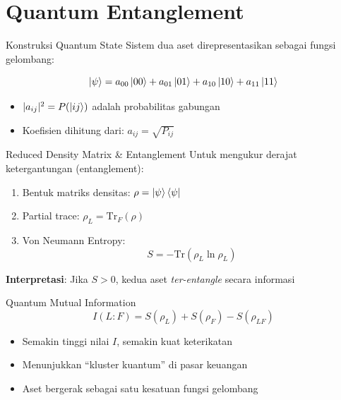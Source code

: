 \documentclass[aspectratio=169]{beamer}
\begin{document}
\section{Quantum Entanglement}

\begin{frame}{Konstruksi Quantum State}
    Sistem dua aset direpresentasikan sebagai fungsi gelombang:
    
    \begin{equation}
        \ket{\psi} = a_{00} \ket{00} + a_{01} \ket{01} + a_{10} \ket{10} + a_{11} \ket{11}
    \end{equation}
    
    \vspace{0.5cm}
    
    \begin{itemize}
        \item $|a_{ij}|^2 = P(\ket{ij})$ adalah probabilitas gabungan
        \item Koefisien dihitung dari: $a_{ij} = \sqrt{P_{ij}}$
    \end{itemize}
\end{frame}

\begin{frame}{Reduced Density Matrix \& Entanglement}
    Untuk mengukur derajat ketergantungan (entanglement):
    
    \begin{enumerate}
        \item Bentuk matriks densitas: $\rho = \ket{\psi}\bra{\psi}$
        \item Partial trace: $\rho_L = \text{Tr}_F(\rho)$
        \item Von Neumann Entropy:
        \begin{equation}
            S = -\text{Tr}(\rho_L \ln \rho_L)
        \end{equation}
    \end{enumerate}
    
    \vspace{0.5cm}
    
    \textbf{Interpretasi}: Jika $S > 0$, kedua aset \textit{ter-entangle} secara informasi
\end{frame}

\begin{frame}{Quantum Mutual Information}
    \begin{equation}
        I(L:F) = S(\rho_L) + S(\rho_F) - S(\rho_{LF})
    \end{equation}
    
    \vspace{0.5cm}
    
    \begin{itemize}
        \item Semakin tinggi nilai $I$, semakin kuat keterikatan
        \item Menunjukkan ``kluster kuantum'' di pasar keuangan
        \item Aset bergerak sebagai satu kesatuan fungsi gelombang
    \end{itemize}
\end{frame}
\end{document}
